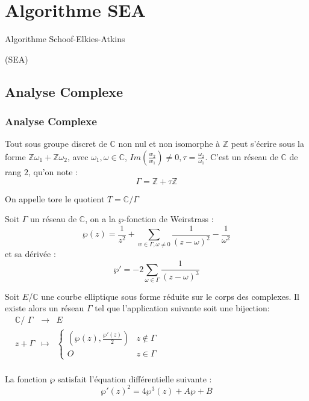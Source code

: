 \documentclass[french]{beamer}
\begin{document}
\section{Algorithme SEA}
\begin{frame}
\begin{center}
\LARGE{Algorithme Schoof-Elkies-Atkins}
\end{center}
\begin{center}
(SEA)
\end{center}
\end{frame}
\subsection{Analyse Complexe}
\begin{frame}
\frametitle{Analyse Complexe}
\begin{definition}
Tout sous groupe discret de $\mathbb{C}$ non nul et non isomorphe à $\mathbb{Z}$ peut s'écrire sous la forme $\mathbb{Z}\omega_1 + \mathbb{Z}\omega_2$, avec $\omega_1, \omega \in \mathbb{C}$, $Im(\frac{w_2}{w_1}) \ne 0, \tau = \frac{\omega_2}{\omega_1}$. C'est un réseau de $\mathbb{C}$ de rang $2$, qu'on note :
$$\Gamma = \mathbb{Z} + \tau \mathbb{Z}$$
\end{definition}

\begin{definition}
On appelle tore le quotient $T=\mathbb{C} / \Gamma$
\end{definition}
\end{frame}

\begin{frame}
Soit $\Gamma$ un réseau de $\mathbb{C}$, on a la $\wp$-fonction de Weirstrass :
$$ \wp(z) = \frac{1}{z^2} + \sum_{w \in \Gamma, \omega \ne 0} \frac{1}{(z-\omega)^2} - \frac{1}{\omega^2} $$
et sa dérivée : 
$$ {\wp'} = -2 \sum_{\omega \in \Gamma} \frac{1}{(z-\omega)^3} $$
\begin{theorem}
Soit $E$/$\mathbb{C}$ une courbe elliptique sous forme réduite sur le corps des complexes. Il existe alors un réseau $\Gamma$ tel que l'application suivante soit une bijection:
\newline
$\begin{array}{cccc}
& \mathbb{C}\text{/ }\Gamma & \to & E \\
& z + \Gamma & \mapsto & \left\lbrace
\begin{array}{cc}
 (\wp(z), \frac{{\wp'}(z)}{2})  & z \notin \Gamma \\
 O & z \in \Gamma
\end{array}\right.\\
\end{array}$
\end{theorem}
La fonction $\wp$ satisfait l'équation différentielle suivante : 
\begin{equation*}
{\wp'}(z)^2 = 4\wp^3(z) + A \wp + B
\end{equation*}
\end{frame}
\end{document}
